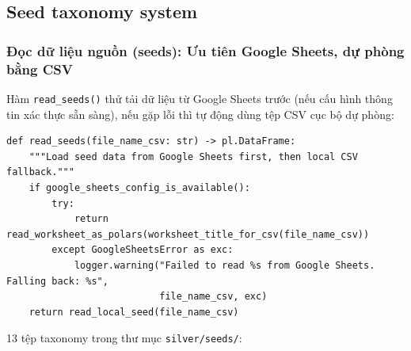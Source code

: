 \subsection{Seed taxonomy system}
\label{subsec:seed-taxonomy}

\subsubsection{Đọc dữ liệu nguồn (seeds): Ưu tiên Google Sheets, dự phòng bằng CSV}

Hàm \texttt{read\_seeds()} thử tải dữ liệu từ Google Sheets trước (nếu cấu hình thông tin xác thực sẵn sàng),
nếu gặp lỗi thì tự động dùng tệp CSV cục bộ dự phòng:

\begin{lstlisting}[style=pystyle, caption={Tải dữ liệu seed: ưu tiên Google Sheets, dự phòng bằng CSV cục bộ}, label={lst:read-seeds}]
def read_seeds(file_name_csv: str) -> pl.DataFrame:
    """Load seed data from Google Sheets first, then local CSV fallback."""
    if google_sheets_config_is_available():
        try:
            return read_worksheet_as_polars(worksheet_title_for_csv(file_name_csv))
        except GoogleSheetsError as exc:
            logger.warning("Failed to read %s from Google Sheets. Falling back: %s",
                           file_name_csv, exc)
    return read_local_seed(file_name_csv)
\end{lstlisting}

13 tệp taxonomy trong thư mục \texttt{silver/seeds/}:


